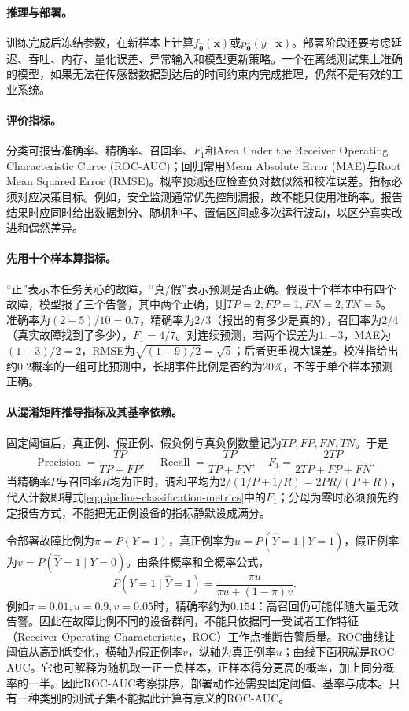 \paragraph{推理与部署。}
训练完成后冻结参数，在新样本上计算$f_{\hat{\bm{\theta}}}(\bm{x})$或$p_{\hat{\bm{\theta}}}(y\mid\bm{x})$。部署阶段还要考虑延迟、吞吐、内存、量化误差、异常输入和模型更新策略。一个在离线测试集上准确的模型，如果无法在传感器数据到达后的时间约束内完成推理，仍然不是有效的工业系统。

\paragraph{评价指标。}
分类可报告准确率、精确率、召回率、$F_1$和Area Under the Receiver Operating Characteristic Curve (ROC-AUC)；回归常用Mean Absolute Error (MAE)与Root Mean Squared Error (RMSE)。概率预测还应检查负对数似然和校准误差。指标必须对应决策目标。例如，安全监测通常优先控制漏报，故不能只使用准确率。报告结果时应同时给出数据划分、随机种子、置信区间或多次运行波动，以区分真实改进和偶然差异。

\paragraph{先用十个样本算指标。}
“正”表示本任务关心的故障，“真/假”表示预测是否正确。假设十个样本中有四个故障，模型报了三个告警，其中两个正确，则$TP=2,FP=1,FN=2,TN=5$。准确率为$(2+5)/10=0.7$，精确率为$2/3$（报出的有多少是真的），召回率为$2/4$（真实故障找到了多少），$F_1=4/7$。对连续预测，若两个误差为$1,-3$，MAE为$(1+3)/2=2$，RMSE为$\sqrt{(1+9)/2}=\sqrt5$；后者更重视大误差。校准指给出约$0.2$概率的一组可比预测中，长期事件比例是否约为$20\%$，不等于单个样本预测正确。

\paragraph{从混淆矩阵推导指标及其基率依赖。}
固定阈值后，真正例、假正例、假负例与真负例数量记为$TP,FP,FN,TN$。于是
\begin{equation}
 \operatorname{Precision}=\frac{TP}{TP+FP},\quad
 \operatorname{Recall}=\frac{TP}{TP+FN},\quad
 F_1=\frac{2TP}{2TP+FP+FN}.\label{eq:pipeline-classification-metrics}
\end{equation}
当精确率$P$与召回率$R$均为正时，调和平均为$2/(1/P+1/R)=2PR/(P+R)$，代入计数即得式\eqref{eq:pipeline-classification-metrics}中的$F_1$；分母为零时必须预先约定报告方式，不能把无正例设备的指标静默设成满分。

令部署故障比例为$\pi=P(Y=1)$，真正例率为$u=P(\hat Y=1\mid Y=1)$，假正例率为$v=P(\hat Y=1\mid Y=0)$。由条件概率和全概率公式，
\begin{equation}
 P(Y=1\mid\hat Y=1)=\frac{\pi u}{\pi u+(1-\pi)v}.
\end{equation}
例如$\pi=0.01,u=0.9,v=0.05$时，精确率约为$0.154$：高召回仍可能伴随大量无效告警。因此在故障比例不同的设备群间，不能只依据同一受试者工作特征（Receiver Operating Characteristic，ROC）工作点推断告警质量。ROC曲线让阈值从高到低变化，横轴为假正例率$v$，纵轴为真正例率$u$；曲线下面积就是ROC-AUC。它也可解释为随机取一正一负样本，正样本得分更高的概率，加上同分概率的一半。因此ROC-AUC考察排序，部署动作还需要固定阈值、基率与成本。只有一种类别的测试子集不能据此计算有意义的ROC-AUC。

